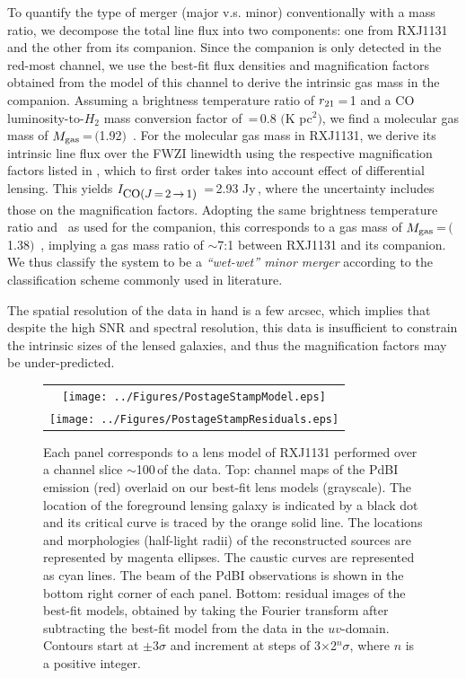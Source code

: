 \documentclass[]{emulateapj}
\begin{document}
To quantify the type of merger (major v.s. minor) conventionally with a mass
ratio, we decompose the total line flux into two components:
one from RXJ1131 and the other from its companion.
Since the companion is only detected in the red-most channel, we
use the best-fit flux densities and magnification factors obtained
from the model of this channel to derive the intrinsic gas mass in the companion.
Assuming a brightness temperature ratio of $r_{\rm 21}$\,=\,1 and
a CO luminosity-to-$H_2$ mass conversion factor of
\alphaco\,=\,0.8 $($K \kms pc$^2$$)$\pmOne, we find 
a molecular gas mass of $M_{\rm gas}$\,=\,$($1.92$)$\, \Msun. 
For the molecular gas mass in RXJ1131, we derive
its intrinsic line flux over the FWZI linewidth
using the respective magnification
factors listed in , which to
first order takes into account effect of differential lensing.
This yields $I_{\small \mbox{CO($J$\,=\,2\,$\rightarrow$\,1) }}$\,=\,2.93 Jy\,\kms,
where the uncertainty includes those on
the magnification factors.
Adopting the same brightness temperature ratio and \alphaco\ as
used for the companion, this corresponds to a gas mass of
$M_{\rm gas}$\,=\,$($1.38$)$\, \Msun,
implying a gas mass ratio of $\sim$7:1 between RXJ1131 and its companion.
We thus classify the system to be a {\em ``wet-wet'' minor merger} according to
the classification scheme commonly used in literature.

The spatial resolution of the data in hand
is a few arcsec, which implies that despite the high SNR and spectral
resolution, this data is insufficient to constrain the
intrinsic sizes of the lensed galaxies, and thus the magnification
factors may be under-predicted. %

\begin{figure}[tbph]
\centering
\begin{tabular}{c}
\texttt{[image: ../Figures/PostageStampModel.eps]} \\
\texttt{[image: ../Figures/PostageStampResiduals.eps]}
\end{tabular}
\caption{Each panel corresponds to a lens model of RXJ1131 performed over a
channel slice $\sim$100\,\kms of the \bco data. Top: channel maps of the
PdBI \bco emission (red) overlaid on our best-fit lens models (grayscale).
The location of the foreground lensing galaxy is indicated by a black dot and
its critical curve is traced by the orange solid line. The locations and
morphologies (half-light radii) of the reconstructed sources are
represented by magenta ellipses.
The caustic curves are represented as cyan lines. The beam of the
PdBI observations is shown in the bottom right corner of each panel.
Bottom: residual images of the best-fit models, obtained by
taking the Fourier transform after subtracting the best-fit model from the
data in the $uv$-domain. Contours start
at $\pm$3$\sigma$ and increment at steps of 3$\times$2$^n\sigma$,
where $n$ is a positive integer.
\label{fig:model}}
\end{figure}
\end{document}
